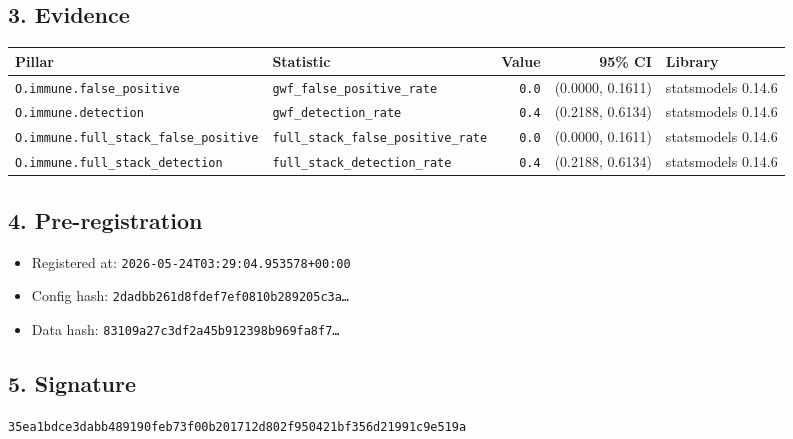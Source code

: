 \documentclass{article}
\begin{document}
\subsection*{3. Evidence}
\begin{tabular}{llrrl}\toprule
\textbf{Pillar} & \textbf{Statistic} & \textbf{Value} & \textbf{95\% CI} & \textbf{Library} \\\midrule
\texttt{O.immune.false\_positive} & \texttt{gwf\_false\_positive\_rate} & \texttt{0.0} & (0.0000, 0.1611) & statsmodels 0.14.6 \\
\texttt{O.immune.detection} & \texttt{gwf\_detection\_rate} & \texttt{0.4} & (0.2188, 0.6134) & statsmodels 0.14.6 \\
\texttt{O.immune.full\_stack\_false\_positive} & \texttt{full\_stack\_false\_positive\_rate} & \texttt{0.0} & (0.0000, 0.1611) & statsmodels 0.14.6 \\
\texttt{O.immune.full\_stack\_detection} & \texttt{full\_stack\_detection\_rate} & \texttt{0.4} & (0.2188, 0.6134) & statsmodels 0.14.6 \\
\bottomrule\end{tabular}
\subsection*{4. Pre-registration}
\begin{itemize}
\item Registered at: \texttt{2026-05-24T03:29:04.953578+00:00}
\item Config hash: \texttt{2dadbb261d8fdef7ef0810b289205c3a\dots}
\item Data hash: \texttt{83109a27c3df2a45b912398b969fa8f7\dots}
\end{itemize}
\subsection*{5. Signature}
\texttt{35ea1bdce3dabb489190feb73f00b201712d802f950421bf356d21991c9e519a}\\
\end{document}
